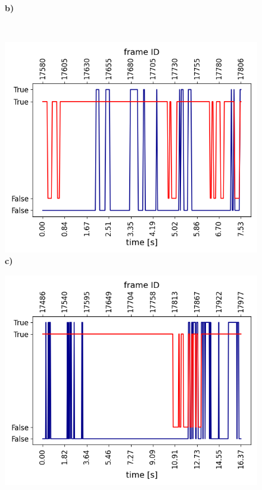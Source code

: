 \begin{figure}[h]
\begin{minipage}{0.5\textwidth}
        \textbf{b)}
    \end{minipage}\hfill \\\vspace{0.2cm}
    \begin{minipage}{0.5\textwidth}
        \centering
        \includegraphics[width=\textwidth]{images/dreyeve/gazes/3.png}
        \textbf{c)}
    \end{minipage}\hfill
    \begin{minipage}{0.5\textwidth}
        \centering
        \includegraphics[width=\textwidth]{images/dreyeve/gazes/4.png}

\end{minipage}
\end{figure}
